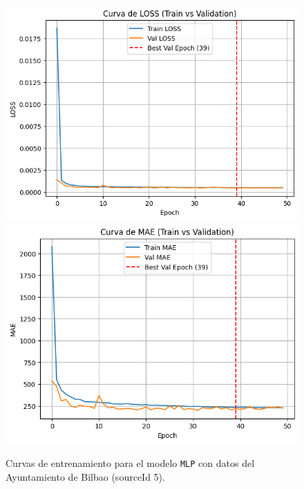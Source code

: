 \begin{figure}[H]
	\centering
	\caption{Curvas de entrenamiento para el modelo \texttt{MLP} con datos del Ayuntamiento de Bilbao (sourceId 5).}
	\begin{minipage}{0.48\textwidth}
		\centering
		\includegraphics[width=\linewidth]{includes/cap5/graphs/sid5_mlp_loss.png}
		\vspace{0.2cm}
		\includegraphics[width=\linewidth]{includes/cap5/graphs/sid5_mlp_mae.png}
		\vspace{0.2cm}

\end{minipage}
\end{figure}

